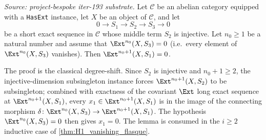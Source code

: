 \begin{lemma}

  \label{lem:ext_succ_zero_of_injective_lower_zero}
  \textit{Source: project-bespoke iter-193 substrate.}
  Let $\mathcal C$ be an abelian category equipped with a
  \texttt{HasExt} instance, let $X$ be an object of $\mathcal C$, and
  let
  \[
    0 \to S_1 \to S_2 \to S_3 \to 0
  \]
  be a short exact sequence in $\mathcal C$ whose middle term $S_2$ is
  injective. Let $n_0 \ge 1$ be a natural number and assume that
  $\Ext^{n_0}(X, S_3) = 0$ (i.e.\ every element of $\Ext^{n_0}(X, S_3)$
  vanishes). Then $\Ext^{n_0 + 1}(X, S_1) = 0$.

  The proof is the classical degree-shift. Since $S_2$ is injective and
  $n_0 + 1 \ge 2$, the injective-dimension subsingleton instance forces
  $\Ext^{n_0 + 1}(X, S_2)$ to be subsingleton; combined with exactness
  of the covariant $\Ext$ long exact sequence at $\Ext^{n_0 + 1}(X,
  S_1)$, every $x_1 \in \Ext^{n_0 + 1}(X, S_1)$ is in the image of the
  connecting morphism $\delta \colon \Ext^{n_0}(X, S_3) \to
  \Ext^{n_0 + 1}(X, S_1)$. The hypothesis
  $\Ext^{n_0}(X, S_3) = 0$ then gives $x_1 = 0$. The lemma is consumed
  in the $i \ge 2$ inductive case of \cref{thm:H1_vanishing_flasque}.
\end{lemma}

